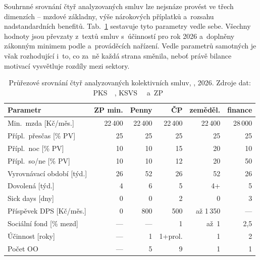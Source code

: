 
Souhrnné srovnání čtyř analyzovaných smluv lze nejsnáze provést ve třech dimenzích -- mzdové základny, výše nárokových příplatků a~rozsahu nadstandardních benefitů.
Tab.~\ref{tab:cs_srovnani} sestavuje tyto parametry vedle sebe. Všechny hodnoty jsou převzaty z~textů smluv s~účinností pro rok 2026 a~doplněny zákonným minimem podle  a~prováděcích nařízení.
Vedle parametrů samotných je však rozhodující i~to, co za~ně každá strana směnila, neboť právě bilance motivací vysvětluje rozdíly mezi sektory.\par

\begin{table}[H]
  \centering
  \caption[Průřezové srovnání analyzovaných kolektivních smluv]{Průřezové srovnání čtyř analyzovaných kolektivních smluv, , 2026. Zdroje dat: \acs{PKS}~\cite{PennyMarket_KS2026}~\cite{KS_CeskaPosta_2025}, \acs{KSVS}~\cite{KSVS_OSPZV_ASO_2026}~\cite{KSVS_OSPPP_2026} a~\acs{ZP}~\cite{zakon_zp_2006}}
  \label{tab:cs_srovnani}
  \begin{tabularx}{\linewidth}{Xrrrrr}
    \toprule
    \textbf{Parametr} & \textbf{\acs{ZP} min.} & \textbf{Penny} & \textbf{\acs{ČP}} & \textbf{zeměděl.} & \textbf{finance} \\
    \midrule
    Min.~mzda [Kč/měs.] & 22\,400 & 22\,400 & 22\,400 & 22\,400 & 28\,000 \\
    Přípl.~přesčas [\% \acs{PV}] & 25 & 25 & 25 & 25 & 25 \\
    Přípl.~noc [\% \acs{PV}] & 10 & 10 & 15 & 20 & 10 \\
    Přípl.~so/ne [\% \acs{PV}] & 10 & 10 & 12 & 20 & 50 \\
    Vyrovnávací období [týd.] & 26 & 52 & 26 & 52 & 26 \\
    Dovolená [týd.] & 4 & 6 & 5 & 4+ & 5 \\
    Sick days [dny] & 0 & 0 & 2 & 0 & 3 \\
    Příspěvek \acs{DPS} [Kč/měs.] & 0 & 800 & 500 & až 1\,350 & --- \\
    Sociální fond [\% mezd] & --- & --- & 1 & až~1 & 2{,}5 \\
    Účinnost [roky] & --- & 1 & 1+prol. & 1 & 2 \\
    Počet \acs{OO} & --- & 5 & 9 & 1 & 1 \\
    \bottomrule
  \end{tabularx}
\end{table}

